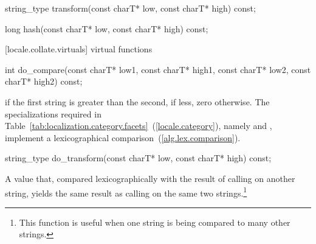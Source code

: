 %
%
\begin{itemdecl}
string_type transform(const charT* low, const charT* high) const;
\end{itemdecl}

\begin{itemdescr}
\pnum
\returns
{}
\end{itemdescr}

%
%
\begin{itemdecl}
long hash(const charT* low, const charT* high) const;
\end{itemdecl}

\begin{itemdescr}
\pnum
\returns
{}
\end{itemdescr}

[locale.collate.virtuals]{ virtual functions}

%
%
\begin{itemdecl}
int do_compare(const charT* low1, const charT* high1,
               const charT* low2, const charT* high2) const;
\end{itemdecl}

\begin{itemdescr}
\pnum
\returns
{}
if the first string is greater than the second,
if less, zero otherwise.
The specializations required in Table~\ref{tab:localization.category.facets}~(\ref{locale.category}), namely
and
,
implement
a lexicographical comparison~(\ref{alg.lex.comparison}).
\end{itemdescr}

%
%
\begin{itemdecl}
string_type do_transform(const charT* low, const charT* high) const;
\end{itemdecl}

\begin{itemdescr}
\pnum
\returns
A
value that, compared lexicographically with the result of calling
on another string, yields the same result as calling
on the same two strings.\footnote{This function is useful when one string is
being compared to many other strings.}
\end{itemdescr}

